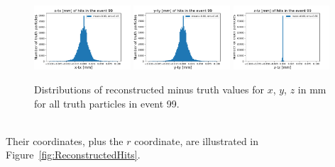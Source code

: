 \begin{figure}[htb]
\centering
\includegraphics[width=0.32\textwidth]{plots/DataExploration_x_tx.pdf}
\includegraphics[width=0.32\textwidth]{plots/DataExploration_y_ty.pdf}
\includegraphics[width=0.32\textwidth]{plots/DataExploration_z_tz.pdf}
\caption{Distributions of reconstructed minus truth values for $x$, $y$, $z$ in mm for all truth particles in event 99.}
\label{fig:ReconstructedToTruthHits}
\end{figure}

\ \\Their coordinates, plus the $r$ coordinate, are illustrated in Figure~\ref{fig:ReconstructedHits}. 

